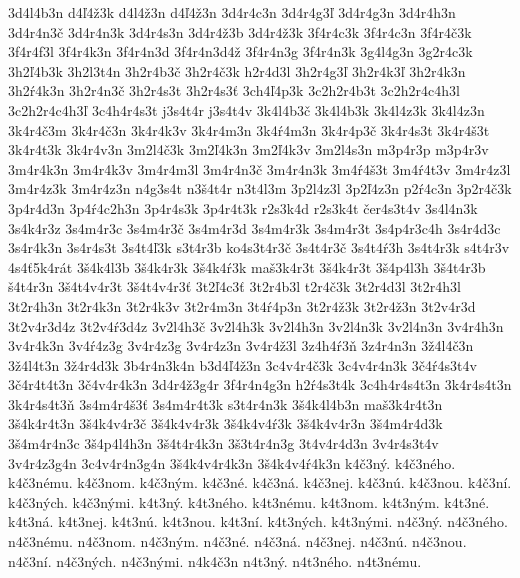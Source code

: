 {3d4l4b3n
d4\v l4\v z3k
d4l4\v z3n
d4\v l4\v z3n
3d4r4c3n
3d4r4g3\v l
3d4r4g3n
3d4r4h3n
3d4r4n3\v c
3d4r4n3k
3d4r4s3n
3d4r4\v z3b
3d4r4\v z3k
3f4r4c3k
3f4r4c3n
3f4r4\v c3k
3f4r4f3l
3f4r4k3n
3f4r4n3d
3f4r4n3d4\v z
3f4r4n3g
3f4r4n3k
3g4l4g3n
3g2r4c3k
3h2\v l4b3k
3h2l3t4n
3h2r4b3\v c
3h2r4\v c3k
h2r4d3l
3h2r4g3\v l
3h2r4k3\v l
3h2r4k3n
3h2\'r4k3n
3h2r4n3\v c
3h2r4s3t
3h2r4s3\v t
3ch4\v l4p3k
3c2h2r4b3t
3c2h2r4c4h3l
3c2h2r4c4h3\v l
3c4h4r4s3t
j3s4t4r
j3s4t4v
3k4l4b3\v c
3k4l4b3k
3k4l4z3k
3k4l4z3n
3k4r4\v c3m
3k4r4\v c3n
3k4r4k3v
3k4r4m3n
3k4\'r4m3n
3k4r4p3\v c
3k4r4s3t
3k4r4\v s3t
3k4r4t3k
3k4r4v3n
3m2l4\v c3k
3m2\v l4k3n
3m2\v l4k3v
3m2l4s3n
m3p4r3p
m3p4r3v
3m4r4k3n
3m4r4k3v
3m4r4m3l
3m4r4n3\v c
3m4r4n3k
3m4\'r4\v s3t
3m4\'r4t3v
3m4r4z3l
3m4r4z3k
3m4r4z3n
n4g3s4t
n3\v s4t4r
n3t4l3m
3p2l4z3l
3p2\v l4z3n
p2\'r4c3n
3p2r4\v c3k
3p4r4d3n
3p4\'r4c2h3n
3p4r4s3k
3p4r4t3k
r2s3k4d
r2s3k4t
\v cer4s3t4v
3s4l4n3k
3s4k4r3z
3s4m4r3c
3s4m4r3\v c
3s4m4r3d
3s4m4r3k
3s4m4r3t
3s4p4r3c4h
3s4r4d3c
3s4r4k3n
3s4r4s3t
3s4t4\v l3k
s3t4r3b
ko4s3t4r3\v c
3s4t4r3\v c
3s4t4\'r3h
3s4t4r3k
s4t4r3v
4s4\v t5k4r\'at
3\v s4k4l3b
3\v s4k4r3k
3\v s4k4\'r3k
ma\v s3k4r3t
3\v s4k4r3t
3\v s4p4l3h
3\v s4t4r3b
\v s4t4r3n
3\v s4t4v4r3t
3\v s4t4v4r3\v t
3t2\v l4c3\v t
3t2r4b3l
t2r4\v c3k
3t2r4d3l
3t2r4h3l
3t2r4h3n
3t2r4k3n
3t2r4k3v
3t2r4m3n
3t4\'r4p3n
3t2r4\v z3k
3t2r4\v z3n
3t2v4r3d
3t2v4r3d4z
3t2v4\'r3d4z
3v2l4h3\v c
3v2l4h3k
3v2l4h3n
3v2l4n3k
3v2l4n3n
3v4r4h3n
3v4r4k3n
3v4\'r4z3g
3v4r4z3g
3v4r4z3n
3v4r4\v z3l
3z4h4\'r3\v n
3z4r4n3n
3\v z4l4\v c3n
3\v z4l4t3n
3\v z4r4d3k
3b4r4n3k4n
b3d4\v l4\v z3n
3c4v4r4\v c3k
3c4v4r4n3k
3\v c4\'r4s3t4v
3\v c4r4t4t3n
3\v c4v4r4k3n
3d4r4\v z3g4r
3f4r4n4g3n
h2\'r4s3t4k
3c4h4r4s4t3n
3k4r4s4t3n
3k4r4s4t3\v n
3s4m4r4\v s3\v t
3s4m4r4t3k
s3t4r4n3k
3\v s4k4l4b3n
ma\v s3k4r4t3n
3\v s4k4r4t3n
3\v s4k4v4r3\v c
3\v s4k4v4r3k
3\v s4k4v4\'r3k
3\v s4k4v4r3n
3\v s4m4r4d3k
3\v s4m4r4n3c
3\v s4p4l4h3n
3\v s4t4r4k3n
3\v s3t4r4n3g
3t4v4r4d3n
3v4r4s3t4v
3v4r4z3g4n
3c4v4r4n3g4n
3\v s4k4v4r4k3n
3\v s4k4v4\'r4k3n
k4\v c3n\'y.
k4\v c3n\'eho.
k4\v c3n\'emu.
k4\v c3nom.
k4\v c3n\'ym.
k4\v c3n\'e.
k4\v c3n\'a.
k4\v c3nej.
k4\v c3n\'u.
k4\v c3nou.
k4\v c3n\'i.
k4\v c3n\'ych.
k4\v c3n\'ymi.
k4t3n\'y.
k4t3n\'eho.
k4t3n\'emu.
k4t3nom.
k4t3n\'ym.
k4t3n\'e.
k4t3n\'a.
k4t3nej.
k4t3n\'u.
k4t3nou.
k4t3n\'i.
k4t3n\'ych.
k4t3n\'ymi.
n4\v c3n\'y.
n4\v c3n\'eho.
n4\v c3n\'emu.
n4\v c3nom.
n4\v c3n\'ym.
n4\v c3n\'e.
n4\v c3n\'a.
n4\v c3nej.
n4\v c3n\'u.
n4\v c3nou.
n4\v c3n\'i.
n4\v c3n\'ych.
n4\v c3n\'ymi.
n4k4\v c3n
n4t3n\'y.
n4t3n\'eho.
n4t3n\'emu.
}
